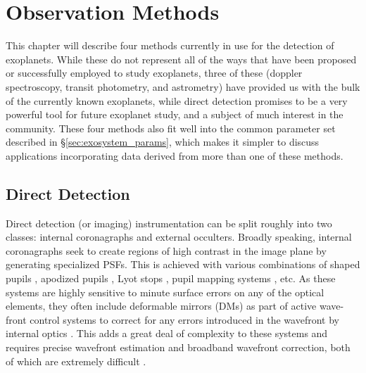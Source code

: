\chapter{Observation Methods}\label{ch:obs_methods}

This chapter will describe four methods currently in use for the detection of exoplanets.  While these do not represent all of the ways that have been proposed or successfully employed to study exoplanets, three of these (doppler spectroscopy, transit photometry, and astrometry) have provided us with the bulk of the currently known exoplanets, while direct detection promises to be a very powerful tool for future exoplanet study, and a subject of much interest in the community.  These four methods also fit well into the common parameter set described in \S\ref{sec:exosystem_params}, which makes it simpler to discuss applications incorporating data derived from more than one of these methods.


\section{Direct Detection}\label{sec:direct_detection}

Direct detection (or imaging) instrumentation can be split roughly into two classes: internal coronagraphs and external occulters.  Broadly speaking, internal coronagraphs seek to create regions of high contrast in the image plane by generating specialized PSFs.  This is achieved with various combinations of shaped pupils \citep{vanderbei2004checkerboard, vanderbei2003circularly, kasdin2005}, apodized pupils \citep{jacquinot1964progress, nisenson2001detection}, Lyot stops \citep{kuchner2002coronagraph, soummer2004apodized}, pupil mapping systems \citep{guyon2003,vanderbei2006diffraction}, etc. As these systems are highly sensitive to minute surface errors on any of the optical elements, they often include deformable mirrors (DMs) as part of active wave-front control systems to correct for any errors introduced in the wavefront by internal optics \citep{pueyo2008broadband}.  This adds a great deal of complexity to these systems and requires precise wavefront estimation and broadband wavefront correction, both of which are extremely difficult \citep{groff2010progress}.


